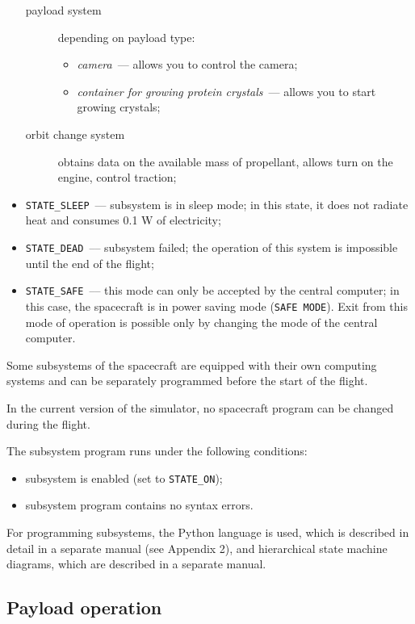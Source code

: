 \documentclass[12pt,a4paper]{article}
\begin{document}
\begin{itemize}
\begin{description}
   \item[payload system] depending on payload type:
     \begin{itemize}
       \item \emph{camera}~--- allows you to control the camera;
       \item \emph{container for growing protein crystals}~--- allows you to start growing crystals;
     \end{itemize}
   \item[orbit change system] obtains data on the available mass of propellant, allows
     turn on the engine, control traction;
   \end{description}
\item \verb'STATE_SLEEP'~--- subsystem is in sleep mode; in this state, it does not radiate heat and consumes 0.1 W of electricity;
\item \verb'STATE_DEAD'~--– subsystem failed; the operation of this system is impossible until the end of the flight;
\item \verb'STATE_SAFE'~--– this mode can only be accepted by the central computer; in this case, the spacecraft is in power saving mode (\verb'SAFE MODE'). Exit from this mode of operation is possible only by changing the mode of the central computer.
\end{itemize}

Some subsystems of the spacecraft are equipped with their own computing systems and can be separately programmed before the start of the flight.

In the current version of the simulator, no spacecraft program can be changed during the flight.

The subsystem program runs under the following conditions:

\begin{itemize}
\item subsystem is enabled (set to \verb'STATE_ON');
\item subsystem program contains no syntax errors.
\end{itemize}

For programming subsystems, the Python language is used, which is described in detail in a separate manual (see Appendix 2), and hierarchical state machine diagrams, which are described in a separate manual.

\subsection{Payload operation}
\label{Sec:Load}
\end{document}
